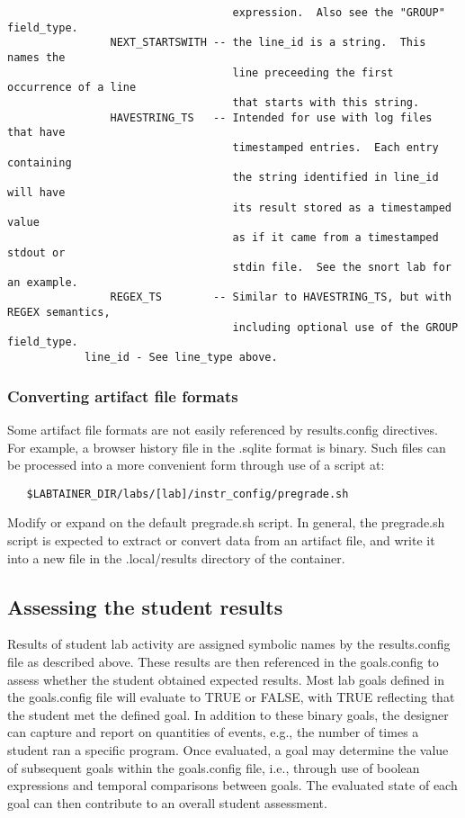 \documentclass[12pt]{article}
\begin{document}
\begin{verbatim}
                                   expression.  Also see the "GROUP" field_type.
                NEXT_STARTSWITH -- the line_id is a string.  This names the 
                                   line preceeding the first occurrence of a line 
                                   that starts with this string. 
                HAVESTRING_TS   -- Intended for use with log files that have 
                                   timestamped entries.  Each entry containing
                                   the string identified in line_id will have
                                   its result stored as a timestamped value
                                   as if it came from a timestamped stdout or 
                                   stdin file.  See the snort lab for an example.
                REGEX_TS        -- Similar to HAVESTRING_TS, but with REGEX semantics,
                                   including optional use of the GROUP field_type.
            line_id - See line_type above.
\end{verbatim}


\subsubsection{Converting artifact file formats}
Some artifact file formats are not easily referenced by results.config directives.
For example, a browser history file in the .sqlite format is binary.  Such files
can be processed into a more convenient form through use of a script at:
\begin{verbatim}
   $LABTAINER_DIR/labs/[lab]/instr_config/pregrade.sh
\end{verbatim}
\noindent Modify or expand on the default pregrade.sh script.
In general, the pregrade.sh script is expected to extract or convert
data from an artifact file, and write it into a new file in the .local/results
directory of the container.   

\subsection{Assessing the student results}
Results of student lab activity are assigned symbolic names by the results.config file
as described above.  These results are then referenced in the goals.config to assess whether
the student obtained expected results.  Most lab goals defined in the goals.config file
will evaluate to TRUE or FALSE, with TRUE reflecting that the student met the defined goal.
In addition to these binary goals, the designer can capture and report on quantities of events,
e.g., the number of times a student ran a specific program.
Once evaluated, a goal may determine the value of subsequent goals within the goals.config file, 
i.e., through use of boolean expressions and temporal comparisons between goals.  The evaluated
state of each goal can then contribute to an overall student assessment.
\end{document}
